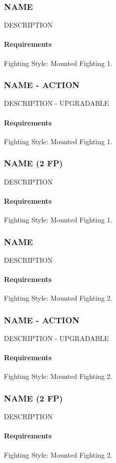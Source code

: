 \subsubsection{NAME} \label{feat::name}
    DESCRIPTION
    \paragraph{Requirements} Fighting Style: Mounted Fighting 1.
\subsubsection{NAME - ACTION} \label{feat::name}
    DESCRIPTION - UPGRADABLE
    \paragraph{Requirements} Fighting Style: Mounted Fighting 1.
\subsubsection{NAME (2 FP)} \label{feat::name}
    DESCRIPTION
    \paragraph{Requirements} Fighting Style: Mounted Fighting 1.
\subsubsection{NAME} \label{feat::name}
    DESCRIPTION
    \paragraph{Requirements} Fighting Style: Mounted Fighting 2.
\subsubsection{NAME - ACTION} \label{feat::name}
    DESCRIPTION - UPGRADABLE
    \paragraph{Requirements} Fighting Style: Mounted Fighting 2.
\subsubsection{NAME (2 FP)} \label{feat::name}
    DESCRIPTION
    \paragraph{Requirements} Fighting Style: Mounted Fighting 2.

